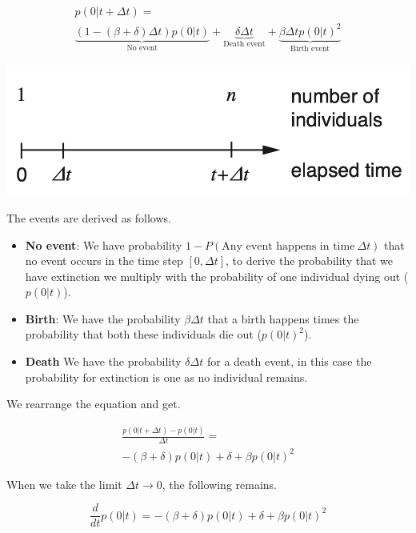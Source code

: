 \documentclass{article}
\begin{document}
\begin{multicols*}{3}
\begin{align*}
    p(0|t+\Delta t) =\\ \underbrace{(1- (\beta + \delta)\Delta t)p(0|t)}_{\text{No event}} + \underbrace{\delta \Delta t}_{\text{Death event}} + \underbrace{\beta \Delta t p (0|t)^2}_{\text{Birth event}}
\end{align*}

\begin{center}
    \includegraphics[width=1\linewidth, angle=0.0]{exprob.png}
\end{center}

The events are derived as follows. 

\begin{itemize}
    \item \textbf{No event}: We have probability $1-P(\text{Any event happens in time} \ \Delta t)$ that no event occurs in the time step $[0, \Delta t]$, to derive the probability that we have extinction we multiply with the probability of one individual dying out ($p(0|t)$). 
    \item \textbf{Birth}: We have the probability $\beta \Delta t$ that a birth happens times the probability that both these individuals die out ($p(0|t)^2$). 
    \item \textbf{Death} We have the probability $\delta \Delta t$ for a death event, in this case the probability for extinction is one as no individual remains. 
\end{itemize}

We rearrange the equation and get. 

\begin{align*}
    \frac{p(0|t+\Delta t)-p(0|t)}{\Delta t} =\\
    -(\beta + \delta)p(0|t) + \delta + \beta p(0|t)^2
\end{align*}

When we take the limit $\Delta t \rightarrow 0$, the following remains. 

$$\frac{d}{dt}p(0|t) = -(\beta + \delta) p (0|t) + \delta + \beta p(0|t)^2$$


\end{multicols*}
\end{document}
